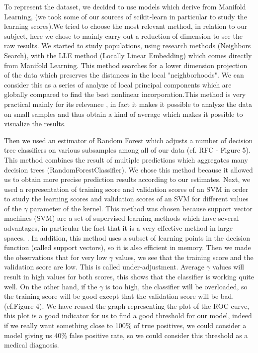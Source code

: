 \documentclass[10pt]{report}
\begin{document}
To represent the dataset, we decided to use models which derive from Manifold Learning, (we took some of our sources of scikit-learn in particular to study the learning scores).We tried to choose the most relevant method, in relation to our subject, here we chose to mainly carry out a reduction of dimension to see the raw results.\medbreak
We started to study populations, using research methods (Neighbors Search), with the LLE method (Locally Linear Embedding) which comes directly from Manifold Learning. This method searches for a lower dimension projection of the data which preserves the distances in the local "neighborhoods". We can consider this as a series of analyze of local principal components which are globally compared to find the best nonlinear incorporation.This method is very practical mainly for its relevance , in fact it makes it possible to analyze the data on small samples and thus obtain a kind of average which makes it possible to visualize the results.\par
Then we used an estimator of Random Forest which adjusts a number of decision tree classifiers on various subsamples among all of our data (cf. RFC - Figure 5). This method combines the result of multiple predictions which aggregates many decision trees (RandomForestClassifier). We chose this method because it allowed us to obtain more precise prediction results according to our estimates.\medbreak
Next, we used a representation of training score and validation scores of an SVM in order to study the learning scores and validation scores of an SVM for different values of the $\gamma$ parameter of the kernel. This method was chosen because support vector machines (SVM) are a set of supervised learning methods which have several advantages, in particular the fact that it is a very effective method in large spaces. . In addition, this method uses a subset of learning points in the decision function (called support vectors), so it is also efficient in memory. Then we made the observations that for very low $\gamma$ values, we see that the training score and the validation score are low. This is called under-adjustment. Average $\gamma$ values will result in high values for both scores, this shows that the classifier is working quite well. On the other hand, if the $\gamma$ is too high, the classifier will be overloaded, so the training score will be good except that the validation score will be bad.(cf.Figure 4). \medbreak
We have reused the graph representing the plot of the ROC curve, this plot is a good indicator for us to find a good threshold for our model, indeed if we really want something close to 100\% of true positives, we could consider a model giving us 40\% false positive rate, so we could consider this threshold as a medical diagnosis.\medbreak
\end{document}
